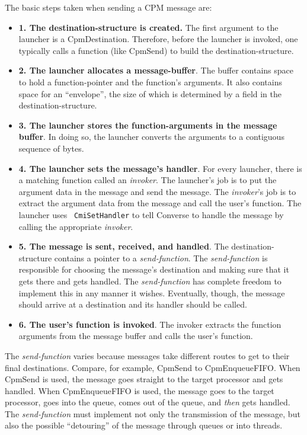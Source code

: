 \pagebreak
The basic steps taken when sending a CPM message are:

\begin{itemize}

\item[]{{\bf 1. The destination-structure is created.}  The first
argument to the launcher is a CpmDestination.  Therefore, before the
launcher is invoked, one typically calls a function (like CpmSend)
to build the destination-structure.}

\item[]{{\bf 2. The launcher allocates a message-buffer}.  The buffer
contains space to hold a function-pointer and the function's arguments.
It also contains space for an ``envelope'', the size of which is
determined by a field in the destination-structure.}

\item[]{{\bf 3. The launcher stores the function-arguments in the message
buffer}.  In doing so, the launcher converts the arguments to a
contiguous sequence of bytes.}

\item[]{{\bf 4. The launcher sets the message's handler}.  For every
launcher, there is a matching function called an {\it invoker}.  The
launcher's job is to put the argument data in the message and send the
message.  The {\it invoker}'s job is to extract the argument data from
the message and call the user's function.  The launcher uses {\tt
CmiSetHandler} to tell Converse to handle the message by calling the
appropriate {\it invoker}.}

\item[]{{\bf 5. The message is sent, received, and handled}. 
The destination-structure contains a pointer to a {\it send-function}.
The {\it send-function} is responsible for choosing the message's
destination and making sure that it gets there and gets handled.  The
{\it send-function} has complete freedom to implement this in any
manner it wishes.  Eventually, though, the message should arrive at a
destination and its handler should be called.}

\item[]{{\bf 6. The user's function is invoked}.  The invoker
extracts the function arguments from the message buffer and calls
the user's function.}

\end{itemize}

The {\it send-function} varies because messages take different
routes to get to their final destinations.  Compare, for example,
CpmSend to CpmEnqueueFIFO.  When CpmSend is used, the message goes
straight to the target processor and gets handled.  When
CpmEnqueueFIFO is used, the message goes to the target processor, goes
into the queue, comes out of the queue, and {\it then} gets handled.
The {\it send-function} must implement not only the transmission of
the message, but also the possible ``detouring'' of the message
through queues or into threads.

